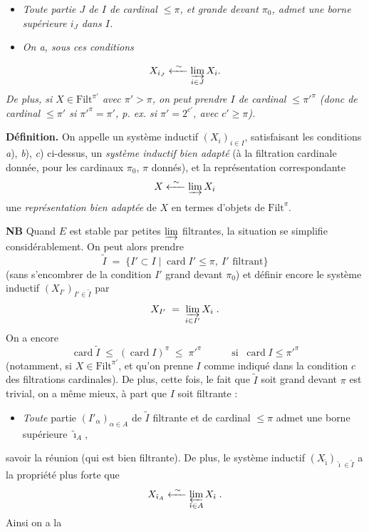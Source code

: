 \documentclass[11pt]{article}
\newcommand{\printedpage}[1]{\marginpar{\footnotesize p.~#1}}
\newcommand{\msp}[1]{\marginpar{\footnotesize [#1]}}
\newcommand{\card}{\operatorname{card}}
\newcommand{\Filt}{\mathrm{Filt}}
\begin{document}
\begin{itemize}
\item[b)] \textit{Toute partie $J$ de $I$ de cardinal $\le\pi$, et grande devant $\pi_0$, admet une borne supérieure $i_J$ dans $I$.}
\item[c)] \textit{On a, sous ces conditions}
\end{itemize}

\printedpage{46}
\msp{page 84}
\[
X_{i_J} \xleftarrow{\ \sim\ } \varinjlim_{i\in J} X_i .
\]
\textit{De plus, si $X\in\Filt^{\pi'}$ avec $\pi'>\pi$, on peut prendre $I$ de cardinal $\le\pi'^{\pi}$ (donc de cardinal $\le\pi'$ si $\pi'^{\pi}=\pi'$, p. ex. si $\pi'=2^{c'}$, avec $c'\ge\pi$).}

\textbf{Définition.} On appelle un système inductif $(X_i)_{i\in I}$, satisfaisant les conditions \textit{a}), \textit{b}), \textit{c}) ci-dessus, un \textit{système inductif bien adapté} (à la filtration cardinale donnée, pour les cardinaux $\pi_0$, $\pi$ donnés), et la représentation correspondante
\[
X \xleftarrow{\ \sim\ } \varinjlim X_i
\]
une \textit{représentation bien adaptée} de $X$ en termes d'objets de $\Filt^\pi$.

\textbf{NB} Quand $E$ est stable par petites $\varinjlim$ filtrantes, la situation se simplifie considérablement. On peut alors prendre
\[
\tilde I \;=\; \{I'\subset I \mid \card I'\le\pi,\ I' \text{ filtrant}\}
\]
(sans s'encombrer de la condition $I'$ grand devant $\pi_0$) et définir encore le système inductif $(X_{I'})_{I'\in\tilde I}$ par
\[
X_{I'} \;=\; \varinjlim_{i\in I'} X_i \;.
\]
On a encore
\msp{page 85}
\[
\card\tilde I \;\le\; (\card I)^\pi \;\le\; \pi'^{\pi} \qquad\quad \text{si }\ \card I\le\pi'^{\pi}
\]
(notamment, si $X\in\Filt^{\pi'}$, et qu'on prenne $I$ comme indiqué dans la condition $c$ des filtrations cardinales). De plus, cette fois, le fait que $\tilde I$ soit grand devant $\pi$ est trivial, on a même mieux, à part que $I$ soit filtrante :

\begin{itemize}
\item[$(*)$] \textit{Toute} partie $(I'_\alpha)_{\alpha\in A}$ de $\tilde I$ filtrante et de cardinal $\le\pi$ admet une borne supérieure $\tilde\imath_A$,
\end{itemize}

savoir la réunion (qui est bien filtrante). De plus, le système inductif $(X_{\tilde\imath})_{\tilde\imath\in\tilde I}$ a la propriété plus forte que
\[
X_{\tilde\imath_A} \xleftarrow{\ \sim\ } \varprojlim_{\tilde\imath\in A} X_{\tilde\imath} \;. %
\]
Ainsi on a la
\end{document}
